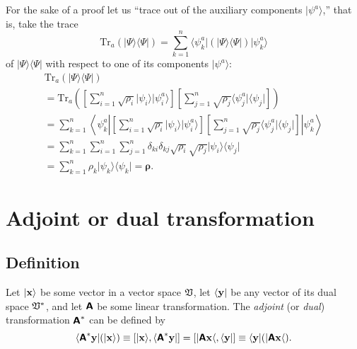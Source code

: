 {%
For the sake of a proof let us ``trace out of the auxiliary components $\vert \psi^a\rangle$,'' that is,
take the trace
\begin{equation}
\textrm{Tr}_{a} (\vert \Psi\rangle \langle \Psi \vert )
=
\sum_{k=1}^n  \langle \psi^a_{k} \vert  (\vert \Psi\rangle \langle \Psi \vert ) \vert \psi^a_{k}\rangle
\end{equation}
of
$\vert \Psi\rangle \langle \Psi \vert$
with respect to one of its components $\vert \psi^a\rangle$:
\begin{equation}
\begin{split}
\textrm{Tr}_{a}\left(
\vert \Psi\rangle \langle \Psi \vert
\right)
\\=
\textrm{Tr}_{a}\left(
\left[\sum_{i=1}^n \sqrt{\rho_{i}}  \vert \psi_{i}\rangle  \vert \psi^a_{i}\rangle \right]
\left[\sum_{j=1}^n \sqrt{\rho_{j}}  \langle  \psi^a_{j}\vert \langle \psi_{j}\vert \right]
\right)
\\=
\sum_{k=1}^n  \left\langle \psi^a_{k} \left\vert
\left[\sum_{i=1}^n \sqrt{\rho_{i}}  \vert \psi_{i}\rangle  \vert \psi^a_{i}\rangle \right]
\left[\sum_{j=1}^n \sqrt{\rho_{j}}  \langle  \psi^a_{j}\vert \langle \psi_{j}\vert \right]
\right\vert \psi^a_{k}\right\rangle
\\=
\sum_{k=1}^n \sum_{i=1}^n \sum_{j=1}^n  \delta_{ki} \delta_{kj}
\sqrt{\rho_{i}} \sqrt{\rho_{j}}
\vert \psi_{i}\rangle
\langle \psi_{j}\vert
\\=
\sum_{k=1}^n
\rho_{k}
\vert \psi_{k}\rangle
\langle \psi_{k}\vert
= {\boldsymbol{\rho}}
.
\label{2015-puranproof1}
\end{split}
\end{equation}
}





\section{Adjoint or dual transformation}
\label{2014-m-fdvs-adjoint}

\subsection{Definition}

Let $\vert {\bf x}\rangle $ be some vector in a vector space ${\frak V}$, let $\langle {\bf y}\vert $
be any vector of its dual space ${\frak V}^\ast$, and let  $\textsf{\textbf{A}}$
be some linear transformation.
The {\em adjoint} (or {\em dual}) transformation $\textsf{\textbf{A}}^\ast$ can be defined by
\begin{equation}
\langle \textsf{\textbf{A}}^\ast  {\bf y} \vert (\vert{\bf x}\rangle )
\equiv
[\vert{\bf x}\rangle ,\langle \textsf{\textbf{A}}^\ast{\bf y}\vert ]
=
[\vert \textsf{\textbf{A}}{\bf x}\langle ,\langle {\bf y}\vert]
\equiv
\langle {\bf y}\vert (\vert \textsf{\textbf{A}}{\bf x}\langle ).
\label{2016-m-ch-fdlvs-adjointop}
\end{equation}




